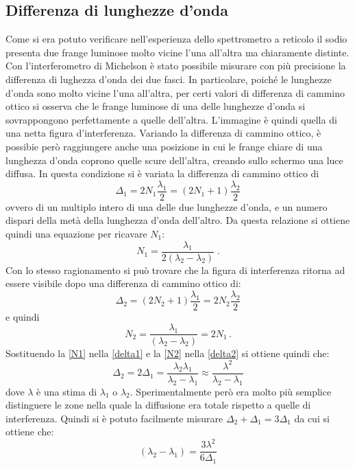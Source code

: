 \documentclass[a4paper,11pt]{article}
\begin{document}
	\subsection{Differenza di lunghezze d'onda}
	Come si era potuto verificare nell'esperienza dello spettrometro a reticolo il sodio presenta due frange luminose molto vicine l'una all'altra ma chiaramente distinte. Con l'interferometro di Michelson è stato possibile misurare con più precisione la differenza di lughezza d'onda dei due fasci. In particolare, poiché le lunghezze d'onda sono molto vicine l'una all'altra, per certi valori di differenza di cammino ottico si osserva che le frange luminose di una delle lunghezze d'onda si sovrappongono perfettamente a quelle dell'altra. L'immagine è quindi quella di una netta figura d'interferenza. Variando la differenza di cammino ottico, è possibie però raggiungere anche una posizione in cui le frange chiare di una lunghezza d'onda coprono quelle scure dell'altra, creando sullo schermo una luce diffusa. In questa condizione si è variata la differenza di cammino ottico di
	\begin{equation}\label{delta1}
		\Delta_1=2N_1\frac{\lambda_1}{2}=(2N_1+1)\frac{\lambda_2}{2}
	\end{equation}
	ovvero di un multiplo intero di una delle due lunghezze d'onda, e un numero dispari della metà della lunghezza d'onda dell'altro. Da questa relazione si ottiene quindi una equazione per ricavare $ N_1 $:
	\begin{equation}\label{N1}
		N_1=\dfrac{\lambda_1}{2\left(\lambda_2-\lambda_2\right)}\;.
	\end{equation}
	Con lo stesso ragionamento si può trovare che la figura di interferenza ritorna ad essere visibile dopo una differenza di cammino ottico di:
	\begin{equation}\label{delta2}
		\Delta_2=(2N_2+1)\frac{\lambda_1}{2}=2N_2\frac{\lambda_2}{2}
	\end{equation}
	e quindi 
	\begin{equation}\label{N2}
		N_2=\dfrac{\lambda_1}{\left(\lambda_2-\lambda_2\right)}=2N_1 \, .
	\end{equation}
	Sostituendo la \ref{N1} nella \ref{delta1} e la \ref{N2} nella \ref{delta2} si ottiene quindi che:
	\begin{equation}\label{deltas}
		\Delta_2=2\Delta_1=\dfrac{\lambda_2\lambda_1}{\lambda_2-\lambda_1}\approx\dfrac{\lambda^2}{\lambda_2-\lambda_1}
	\end{equation}
	dove $ \lambda $ è una stima di $ \lambda_1 $ o $ \lambda_2 $. Sperimentalmente però era molto più semplice distinguere le zone nella quale la diffusione era totale rispetto a quelle di interferenza. Quindi si è potuto facilmente misurare $ \Delta_2+\Delta_1=3\Delta_1 $ da cui si ottiene che:
	\begin{equation}\label{delta-lambda}
		\left(\lambda_2-\lambda_1\right)=\dfrac{3\lambda^2}{6\Delta_1}
	\end{equation}
\end{document}
